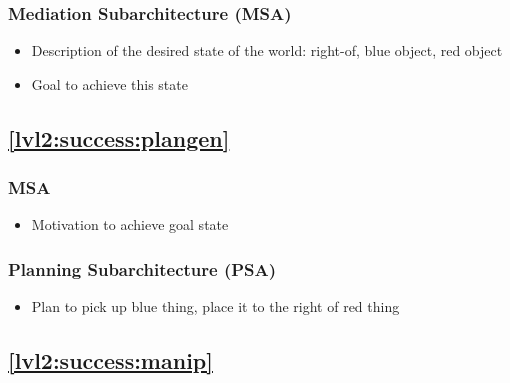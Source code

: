 \documentclass{article}
\begin{document}
\subsubsection{Mediation Subarchitecture (MSA)}

\begin{itemize}

\item Description of the desired state of the world: right-of, blue
  object, red object

\item Goal to achieve this state

\end{itemize}





\subsection{\ref{lvl2:success:plangen}}



\subsubsection{MSA}

\begin{itemize}

\item Motivation to achieve goal state


\end{itemize}




\subsubsection{Planning Subarchitecture (PSA)}

\begin{itemize}

\item Plan to pick up blue thing, place it to the right of red thing


\end{itemize}



\subsection{\ref{lvl2:success:manip}}
\end{document}
